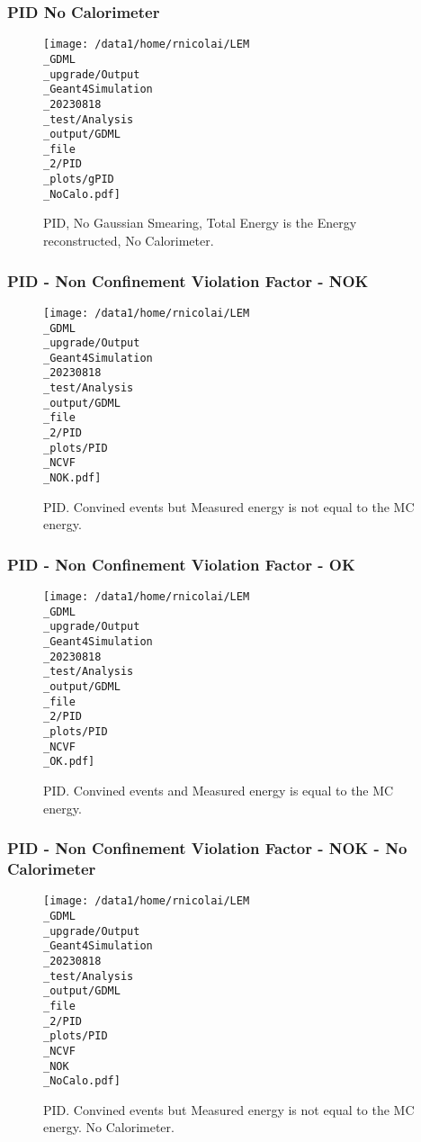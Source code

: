\documentclass[8pt]{beamer}
\begin{document}
            \begin{frame}
                \frametitle{PID No Calorimeter}
            
        \begin{figure}[h]
            \centering
            \texttt{[image: /data1/home/rnicolai/LEM\\\_GDML\\\_upgrade/Output\\\_Geant4Simulation\\\_20230818\\\_test/Analysis\\\_output/GDML\\\_file\\\_2/PID\\\_plots/gPID\\\_NoCalo.pdf]}
            \caption{PID, No Gaussian Smearing, Total Energy is the Energy reconstructed, No Calorimeter.}
        \end{figure}
        
            \end{frame}
            
            \begin{frame}
                \frametitle{PID - Non Confinement Violation Factor - NOK}
            
        \begin{figure}[h]
            \centering
            \texttt{[image: /data1/home/rnicolai/LEM\\\_GDML\\\_upgrade/Output\\\_Geant4Simulation\\\_20230818\\\_test/Analysis\\\_output/GDML\\\_file\\\_2/PID\\\_plots/PID\\\_NCVF\\\_NOK.pdf]}
            \caption{PID. Convined events but Measured energy is not equal to the MC energy.}
        \end{figure}
        
            \end{frame}
            
            \begin{frame}
                \frametitle{PID - Non Confinement Violation Factor - OK}
            
        \begin{figure}[h]
            \centering
            \texttt{[image: /data1/home/rnicolai/LEM\\\_GDML\\\_upgrade/Output\\\_Geant4Simulation\\\_20230818\\\_test/Analysis\\\_output/GDML\\\_file\\\_2/PID\\\_plots/PID\\\_NCVF\\\_OK.pdf]}
            \caption{PID. Convined events and Measured energy is equal to the MC energy.}
        \end{figure}
        
            \end{frame}
            
            \begin{frame}
                \frametitle{PID - Non Confinement Violation Factor - NOK - No Calorimeter}
            
        \begin{figure}[h]
            \centering
            \texttt{[image: /data1/home/rnicolai/LEM\\\_GDML\\\_upgrade/Output\\\_Geant4Simulation\\\_20230818\\\_test/Analysis\\\_output/GDML\\\_file\\\_2/PID\\\_plots/PID\\\_NCVF\\\_NOK\\\_NoCalo.pdf]}
            \caption{PID. Convined events but Measured energy is not equal to the MC energy. No Calorimeter.}
        \end{figure}
        
            \end{frame}
            
\end{document}
